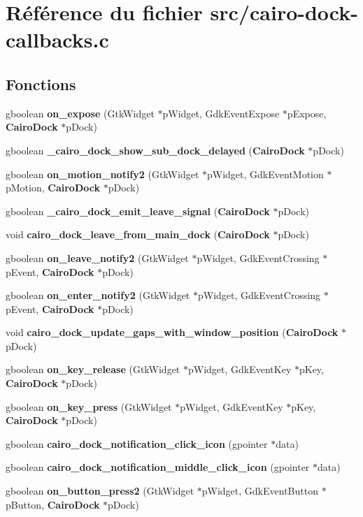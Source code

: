\section{R\'{e}f\'{e}rence du fichier src/cairo-dock-callbacks.c}
\label{cairo-dock-callbacks_8c}
\subsection*{Fonctions}
\begin{CompactItemize}
\item 
gboolean {\bf on\_\-expose} (Gtk\-Widget $\ast$p\-Widget, Gdk\-Event\-Expose $\ast$p\-Expose, {\bf Cairo\-Dock} $\ast$p\-Dock)
\item 
gboolean {\bf \_\-cairo\_\-dock\_\-show\_\-sub\_\-dock\_\-delayed} ({\bf Cairo\-Dock} $\ast$p\-Dock)
\item 
gboolean {\bf on\_\-motion\_\-notify2} (Gtk\-Widget $\ast$p\-Widget, Gdk\-Event\-Motion $\ast$p\-Motion, {\bf Cairo\-Dock} $\ast$p\-Dock)
\item 
gboolean {\bf \_\-cairo\_\-dock\_\-emit\_\-leave\_\-signal} ({\bf Cairo\-Dock} $\ast$p\-Dock)
\item 
void {\bf cairo\_\-dock\_\-leave\_\-from\_\-main\_\-dock} ({\bf Cairo\-Dock} $\ast$p\-Dock)
\item 
gboolean {\bf on\_\-leave\_\-notify2} (Gtk\-Widget $\ast$p\-Widget, Gdk\-Event\-Crossing $\ast$p\-Event, {\bf Cairo\-Dock} $\ast$p\-Dock)
\item 
gboolean {\bf on\_\-enter\_\-notify2} (Gtk\-Widget $\ast$p\-Widget, Gdk\-Event\-Crossing $\ast$p\-Event, {\bf Cairo\-Dock} $\ast$p\-Dock)
\item 
void {\bf cairo\_\-dock\_\-update\_\-gaps\_\-with\_\-window\_\-position} ({\bf Cairo\-Dock} $\ast$p\-Dock)
\item 
gboolean {\bf on\_\-key\_\-release} (Gtk\-Widget $\ast$p\-Widget, Gdk\-Event\-Key $\ast$p\-Key, {\bf Cairo\-Dock} $\ast$p\-Dock)
\item 
gboolean {\bf on\_\-key\_\-press} (Gtk\-Widget $\ast$p\-Widget, Gdk\-Event\-Key $\ast$p\-Key, {\bf Cairo\-Dock} $\ast$p\-Dock)
\item 
gboolean {\bf cairo\_\-dock\_\-notification\_\-click\_\-icon} (gpointer $\ast$data)
\item 
gboolean {\bf cairo\_\-dock\_\-notification\_\-middle\_\-click\_\-icon} (gpointer $\ast$data)
\item 
gboolean {\bf on\_\-button\_\-press2} (Gtk\-Widget $\ast$p\-Widget, Gdk\-Event\-Button $\ast$p\-Button, {\bf Cairo\-Dock} $\ast$p\-Dock)

\end{CompactItemize}
